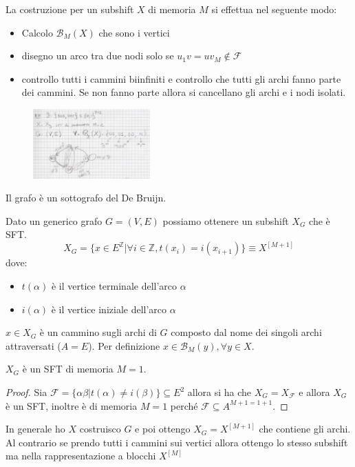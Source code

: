 La costruzione per un subshift $X$ di memoria $M$ si effettua nel seguente modo:
\begin{itemize}
    \item Calcolo $\mathcal{B}_M(X)$ che sono i vertici
    \item disegno un arco tra due nodi solo se $u_1v=uv_M \not \in \mathcal{F}$
    \item controllo tutti i cammini biinfiniti e controllo che tutti gli archi 
    fanno parte dei cammini. Se non fanno parte allora si cancellano gli archi e i
    nodi isolati.
\end{itemize}
\begin{figure}[!h]
    \centering
    \includegraphics[width=0.4\textwidth]{img/sistemi_complessi/subshift.png}
\end{figure}

Il grafo è un sottografo del De Bruijn.

Dato un generico grafo $G=(V,E)$ possiamo ottenere un subshift $X_G$ che è SFT.
$$X_G=\{x\in E^\mathbb{Z}|\forall i\in\mathbb{Z}, t(x_i) = i(x_{i+1}) \}\equiv X^{[M+1]}$$
dove:
\begin{itemize}
    \item $t(\alpha)$ è il vertice terminale dell'arco $\alpha$
    \item $i(\alpha)$ è il vertice iniziale dell'arco $\alpha$
\end{itemize}

$x \in X_G$ è un cammino sugli archi di $G$ composto dal nome dei singoli archi attraversati ($A= E$).
Per definizione $x\in \mathcal{B}_M(y), \forall y\in X$.

\begin{teorema}
    $X_G$ è un SFT di memoria $M=1$.
    \begin{proof}
        Sia $\mathcal{F}= \{\alpha\beta|t(\alpha) \ne i(\beta)\}\subseteq E^2$ allora 
        si ha che $X_G= X_\mathcal{F}$ e allora $X_G$ è un SFT, inoltre è di memoria 
        $M=1$  perché $\mathcal{F}\subseteq A^{M+1=1+1}$.
    \end{proof}
\end{teorema}
In generale ho $X$ costruisco $G$ e poi ottengo $X_G = X^{[M+1]}$ che contiene gli 
archi. Al contrario se prendo tutti i cammini sui vertici allora ottengo lo stesso
subshift ma nella rappresentazione a blocchi $X^{[M]}$

